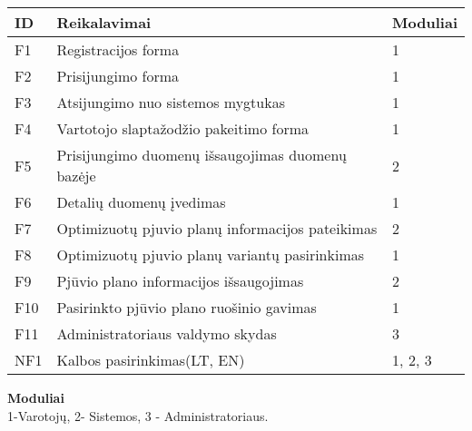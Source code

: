 \documentclass[a4paper,12pt]{article}
\begin{document}
\begin{frame}
\centering

\label{my-label}
\begin{tabular}{|l|l|l|}
\hline
\textbf{ID}              & \textbf{Reikalavimai}               & \textbf{Moduliai}  \\ \hline
F1                       & Registracijos forma                	   & 1      \\ \hline

F2                       & Prisijungimo forma                		   & 1      \\ \hline

F3						& Atsijungimo nuo sistemos mygtukas 	       & 1		\\ \hline

F4                       & Vartotojo slaptažodžio pakeitimo forma   & 1      \\ \hline

F5						& Prisijungimo duomenų išsaugojimas duomenų bazėje 
																   & 2		\\ \hline


F6                       & Detalių duomenų įvedimas           	   & 1            \\ \hline

F7                       & Optimizuotų pjuvio planų informacijos pateikimas 																  						 & 2      \\ \hline

F8                       & Optimizuotų pjuvio planų variantų pasirinkimas 																   					   & 1      \\ \hline

F9                      & Pjūvio plano informacijos išsaugojimas 
															      & 2       \\ \hline

F10                      & Pasirinkto pjūvio plano ruošinio gavimas& 1       \\ \hline


F11						& Administratoriaus valdymo skydas	 	  & 3			\\ \hline


NF1                      & Kalbos pasirinkimas(LT, EN)       	     & 1, 2, 3                 \\ \hline
\end{tabular}
\end{frame}

\vspace{1cm}
\textbf{Moduliai} \\
1-Varotojų, 2- Sistemos, 3 - Administratoriaus.
\end{document}
